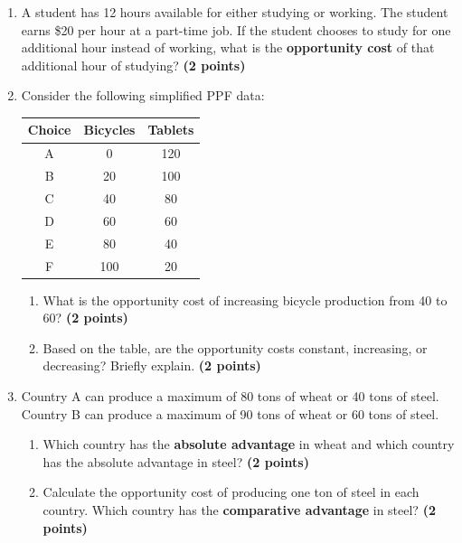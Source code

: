 \documentclass[12pt]{article}
\begin{document}
\begin{enumerate}[resume]

    \item A student has 12 hours available for either studying or working. The student earns \$20 per hour at a part-time job. If the student chooses to study for one additional hour instead of working, what is the \textbf{opportunity cost} of that additional hour of studying? \textbf{(2 points)}

    \item Consider the following simplified PPF data:

    \begin{center}
    \begin{tabular}{ccc}
    \toprule
    Choice & Bicycles & Tablets \\
    \midrule
    A & 0   & 120 \\
    B & 20  & 100 \\
    C & 40  & 80  \\
    D & 60  & 60  \\
    E & 80  & 40  \\
    F & 100 & 20  \\
    \bottomrule
    \end{tabular}
    \end{center}

    \begin{enumerate}
        \item What is the opportunity cost of increasing bicycle production from 40 to 60? \textbf{(2 points)}
        \item Based on the table, are the opportunity costs constant, increasing, or decreasing? Briefly explain. \textbf{(2 points)}
    \end{enumerate}

    \item Country A can produce a maximum of 80 tons of wheat or 40 tons of steel. Country B can produce a maximum of 90 tons of wheat or 60 tons of steel.

    \begin{enumerate}
        \item Which country has the \textbf{absolute advantage} in wheat and which country has the absolute advantage in steel? \textbf{(2 points)}
        \item Calculate the opportunity cost of producing one ton of steel in each country. Which country has the \textbf{comparative advantage} in steel? \textbf{(2 points)}
    \end{enumerate}

\end{enumerate}
\end{document}
